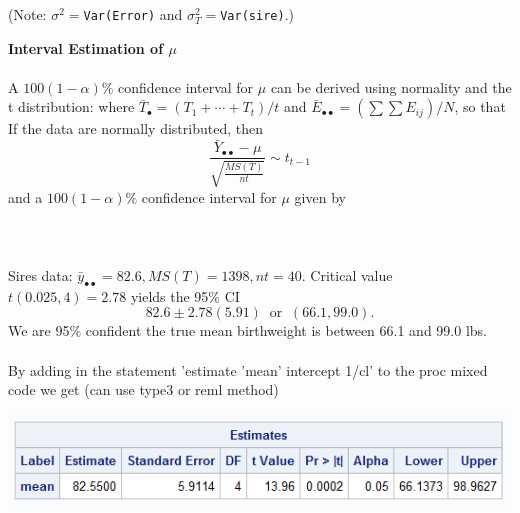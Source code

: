 (Note:  $\sigma^2=${\tt Var(Error)}  and $\sigma_T^2=${\tt Var(sire)}.)  

\newpage

\newpage
\textbf{Interval Estimation of $\mu$}\\~\\
A $100(1-\alpha)\%$ confidence interval for $\mu$ can be derived using normality and the t distribution:
where $\bar{T}_{\bullet}=(T_1 + \cdots + T_t)/t$ and $\bar{E}_{\bullet\bullet}=(\sum \sum E_{ij})/N$,
so that
If the data are normally distributed, then 
$$\frac{\bar{Y}_{\bullet\bullet}-\mu}{\sqrt{\frac{MS(T)}{nt}}} \sim t_{t-1}$$
and a $100(1-\alpha)\%$ confidence interval for $\mu$ given by
~\\~\\~\\~\\

Sires data: $\bar{y}_{\bullet\bullet}=82.6, MS(T)=1398, nt=40.$ 
Critical value $t(0.025,4)=2.78$ yields the 95\% CI
$$82.6 \pm 2.78 (5.91) \ \mbox{ or } \ (66.1,99.0).$$
We are 95\% confident the true mean birthweight is between 66.1 and 99.0 lbs.\\~\\
By adding in the statement 'estimate 'mean' intercept 1/cl' to the proc mixed code we get (can use type3 or reml method)
\begin{center}
\includegraphics[scale=0.8]{Sire3}
\end{center}

\newpage

